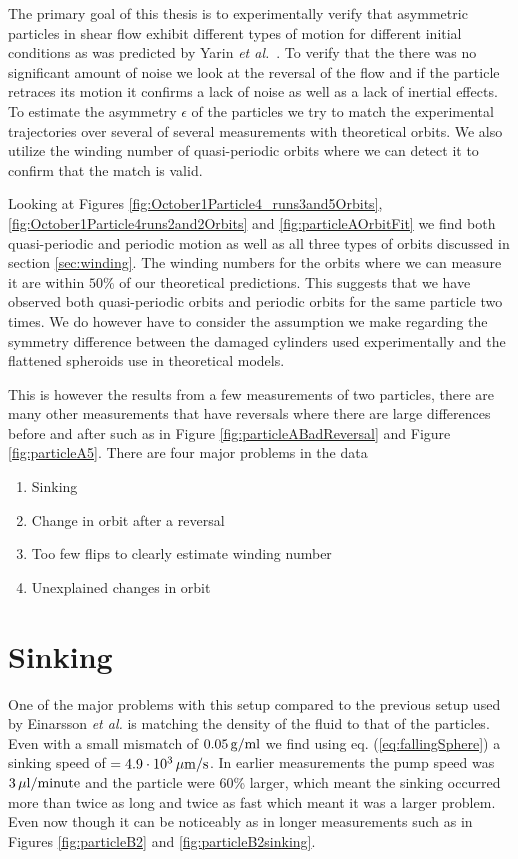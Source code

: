 The primary goal of this thesis is to experimentally verify that asymmetric particles in shear flow exhibit different types of motion for different initial conditions as was predicted by Yarin \emph{et al.}~\cite{Yarin}. To verify that the there was no significant amount of noise we look at the reversal of the flow and if the particle retraces its motion it confirms a lack of noise as well as a lack of inertial effects. To estimate the asymmetry $\epsilon$ of the particles we try to match the experimental trajectories over several of several measurements with theoretical orbits. We also utilize the winding number of quasi-periodic orbits where we can detect it to confirm that the match is valid.

Looking at Figures \ref{fig:October1Particle4_runs3and5Orbits}, \ref{fig:October1Particle4runs2and2Orbits} and \ref{fig:particleAOrbitFit} we find both quasi-periodic and periodic motion as well as all three types of orbits discussed in section \ref{sec:winding}. The winding numbers for the orbits where we can measure it are within $50\%$ of our theoretical predictions. This suggests that we have observed both quasi-periodic orbits and periodic orbits for the same particle two times. We do however have to consider the assumption we make regarding the symmetry difference between the damaged cylinders used experimentally and the flattened spheroids use in theoretical models.

This is however the results from a few measurements of two particles, there are many other measurements that have reversals where there are large differences before and after such as in Figure \ref{fig:particleABadReversal} and Figure \ref{fig:particleA5}. There are four major problems in the data 

\begin{enumerate}
\item Sinking
\item Change in orbit after a reversal
\item Too few flips to clearly estimate winding number
\item Unexplained changes in orbit 
\end{enumerate}

\section{Sinking}
One of the major problems with this setup compared to the previous setup used by Einarsson \emph{et al.} \cite{JonasExperiment} is matching the density of the fluid to that of the particles. Even with a small mismatch of $\unit[0.05]{g/ml}$ we find using eq. (\ref{eq:fallingSphere}) a sinking speed of $= \unit[4.9\cdot10^3 ]{\mu m/s}$. In earlier measurements the pump speed was $\unit[3]{\mu l/minute}$ and the particle were 60\% larger, which meant the sinking occurred more than twice as long and twice as fast which meant it was a larger problem. Even now though it can be noticeably as in longer measurements such as in Figures \ref{fig:particleB2} and \ref{fig:particleB2sinking}.

